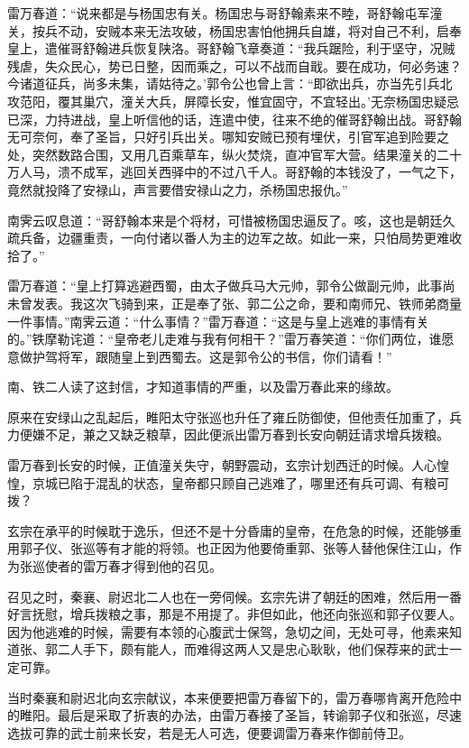 \documentclass[12pt,oneside]{book}
\begin{document}
雷万春道：``说来都是与杨国忠有关。杨国忠与哥舒翰素来不睦，哥舒翰屯军潼关，按兵不动，安贼本来无法攻破，杨国忠害怕他拥兵自雄，将对自己不利，启奉皇上，遣催哥舒翰进兵恢复陕洛。哥舒翰飞章奏道：``我兵踞险，利于坚守，况贼残虐，失众民心，势已日整，因而乘之，可以不战而自戢。要在成功，何必务速？今诸道征兵，尚多未集，请姑待之。'郭令公也曾上言：``即欲出兵，亦当先引兵北攻范阳，覆其巢穴，潼关大兵，屏障长安，惟宜固守，不宜轻出。'无奈杨国忠疑忌已深，力持进战，皇上听信他的话，连遣中使，往来不绝的催哥舒翰出战。哥舒翰无可奈何，奉了圣旨，只好引兵出关。哪知安贼已预有埋伏，引官军追到险要之处，突然数路合围，又用几百乘草车，纵火焚烧，直冲官军大营。结果潼关的二十万人马，溃不成军，逃回关西驿中的不过八千人。哥舒翰的本钱没了，一气之下，竟然就投降了安禄山，声言要借安禄山之力，杀杨国忠报仇。''

南霁云叹息道：``哥舒翰本来是个将材，可惜被杨国忠逼反了。咳，这也是朝廷久疏兵备，边疆重责，一向付诸以番人为主的边军之故。如此一来，只怕局势更难收拾了。''

雷万春道：``皇上打算逃避西蜀，由太子做兵马大元帅，郭令公做副元帅，此事尚未曾发表。我这次飞骑到来，正是奉了张、郭二公之命，要和南师兄、铁师弟商量一件事情。''南霁云道：``什么事情？''雷万春道：``这是与皇上逃难的事情有关的。''铁摩勒诧道：``皇帝老儿走难与我有何相干？''雷万春笑道：``你们两位，谁愿意做护驾将军，跟随皇上到西蜀去。这是郭令公的书信，你们请看！''

南、铁二人读了这封信，才知道事情的严重，以及雷万春此来的缘故。

原来在安绿山之乱起后，睢阳太守张巡也升任了雍丘防御使，但他责任加重了，兵力便嫌不足，兼之又缺乏粮草，因此便派出雷万春到长安向朝廷请求增兵拨粮。

雷万春到长安的时候，正值潼关失守，朝野震动，玄宗计划西迁的时候。人心惶惶，京城已陷于混乱的状态，皇帝都只顾自己逃难了，哪里还有兵可调、有粮可拨？

玄宗在承平的时候耽于逸乐，但还不是十分昏庸的皇帝，在危急的时候，还能够重用郭子仪、张巡等有才能的将领。也正因为他要倚重郭、张等人替他保住江山，作为张巡使者的雷万春才得到他的召见。

召见之时，秦襄、尉迟北二人也在一旁伺候。玄宗先讲了朝廷的困难，然后用一番好言抚慰，增兵拨粮之事，那是不用提了。非但如此，他还向张巡和郭子仪要人。因为他逃难的时候，需要有本领的心腹武士保驾，急切之间，无处可寻，他素来知道张、郭二人手下，颇有能人，而难得这两人又是忠心耿耿，他们保荐来的武士一定可靠。

当时秦襄和尉迟北向玄宗献议，本来便要把雷万春留下的，雷万春哪肯离开危险中的睢阳。最后是采取了折衷的办法，由雷万春接了圣旨，转谕郭子仪和张巡，尽速选拔可靠的武士前来长安，若是无人可选，便要调雷万春来作御前侍卫。
\end{document}

